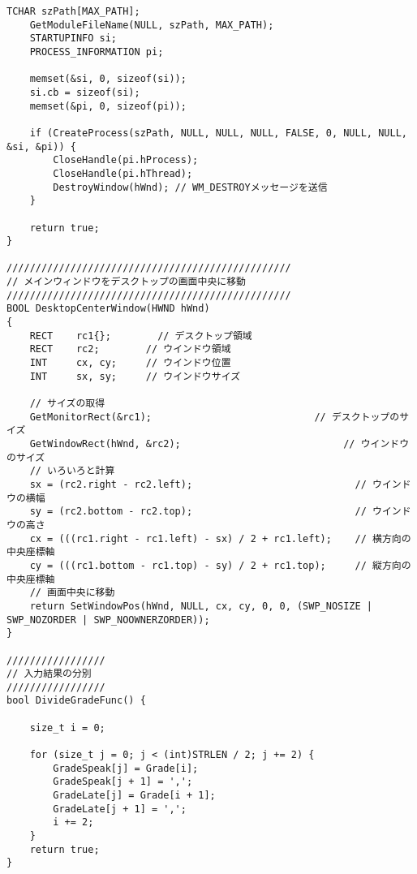 \begin{lstlisting}[caption=main.cpp]
	TCHAR szPath[MAX_PATH];
	GetModuleFileName(NULL, szPath, MAX_PATH);
	STARTUPINFO si;
	PROCESS_INFORMATION pi;

	memset(&si, 0, sizeof(si));
	si.cb = sizeof(si);
	memset(&pi, 0, sizeof(pi));

	if (CreateProcess(szPath, NULL, NULL, NULL, FALSE, 0, NULL, NULL, &si, &pi)) {
		CloseHandle(pi.hProcess);
		CloseHandle(pi.hThread);
		DestroyWindow(hWnd); // WM_DESTROYメッセージを送信
	}

	return true;
}

/////////////////////////////////////////////////
// メインウィンドウをデスクトップの画面中央に移動
/////////////////////////////////////////////////
BOOL DesktopCenterWindow(HWND hWnd)
{
	RECT    rc1{};        // デスクトップ領域
	RECT    rc2;        // ウインドウ領域
	INT     cx, cy;     // ウインドウ位置
	INT     sx, sy;     // ウインドウサイズ

	// サイズの取得
	GetMonitorRect(&rc1);                            // デスクトップのサイズ
	GetWindowRect(hWnd, &rc2);                            // ウインドウのサイズ
	// いろいろと計算
	sx = (rc2.right - rc2.left);                            // ウインドウの横幅
	sy = (rc2.bottom - rc2.top);                            // ウインドウの高さ
	cx = (((rc1.right - rc1.left) - sx) / 2 + rc1.left);    // 横方向の中央座標軸
	cy = (((rc1.bottom - rc1.top) - sy) / 2 + rc1.top);     // 縦方向の中央座標軸
	// 画面中央に移動
	return SetWindowPos(hWnd, NULL, cx, cy, 0, 0, (SWP_NOSIZE | SWP_NOZORDER | SWP_NOOWNERZORDER));
}

/////////////////
// 入力結果の分別
/////////////////
bool DivideGradeFunc() {

	size_t i = 0;

	for (size_t j = 0; j < (int)STRLEN / 2; j += 2) {
		GradeSpeak[j] = Grade[i];
		GradeSpeak[j + 1] = ',';
		GradeLate[j] = Grade[i + 1];
		GradeLate[j + 1] = ',';
		i += 2;
	}
	return true;
}

\end{lstlisting}

